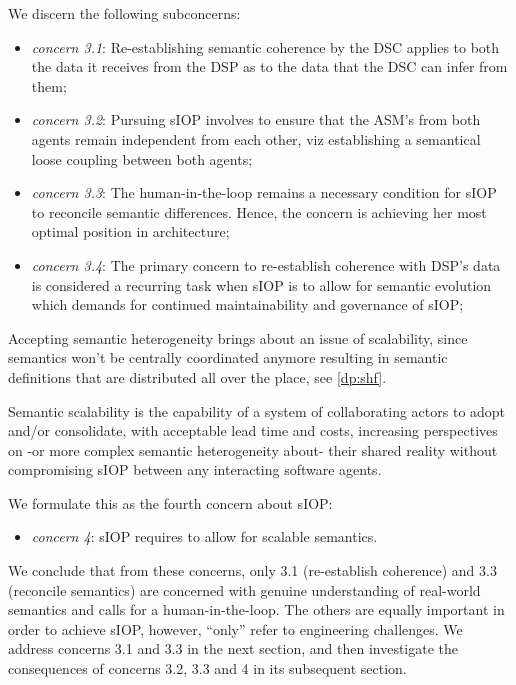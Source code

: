 \documentclass[sort&compress,preprint,authoryear,3p,twocolumn]{elsarticle}
\providecommand{\tightlist}{%
  \setlength{\itemsep}{0pt}\setlength{\parskip}{0pt}}
\begin{document}
We discern the following subconcerns:

\begin{itemize}
\tightlist
\item
  \emph{concern 3.1}: Re-establishing semantic coherence by the DSC
  applies to both the data it receives from the DSP as to the data that
  the DSC can infer from them;
\item
  \emph{concern 3.2}: Pursuing sIOP involves to ensure that the ASM's
  from both agents remain independent from each other, viz establishing
  a semantical loose coupling between both agents;
\item
  \emph{concern 3.3}: The human-in-the-loop remains a necessary
  condition for sIOP to reconcile semantic differences. Hence, the
  concern is achieving her most optimal position in architecture;
\item
  \emph{concern 3.4}: The primary concern to re-establish coherence with
  DSP's data is considered a recurring task when sIOP is to allow for
  semantic evolution which demands for continued maintainability and
  governance of sIOP;
\end{itemize}

Accepting semantic heterogeneity brings about an issue of scalability,
since semantics won't be centrally coordinated anymore resulting in
semantic definitions that are distributed all over the place, see
\cref{dp:shf}.

\begin{mmdef}\label{def:semantic-scalability}
Semantic scalability is the capability of a system of collaborating actors to adopt and/or consolidate, with acceptable lead time and costs, increasing perspectives on -or more complex semantic heterogeneity about- their shared reality without compromising sIOP between any interacting software agents. 
\end{mmdef}

We formulate this as the fourth concern about sIOP:

\begin{itemize}
\tightlist
\item
  \emph{concern 4}: sIOP requires to allow for scalable semantics.
\end{itemize}

We conclude that from these concerns, only 3.1 (re-establish coherence)
and 3.3 (reconcile semantics) are concerned with genuine understanding
of real-world semantics and calls for a human-in-the-loop. The others
are equally important in order to achieve sIOP, however, ``only'' refer
to engineering challenges. We address concerns 3.1 and 3.3 in the next
section, and then investigate the consequences of concerns 3.2, 3.3 and
4 in its subsequent section.
\end{document}
